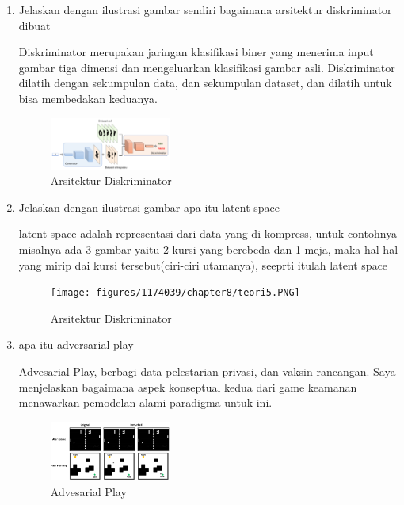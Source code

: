 \begin{enumerate}
            \item Jelaskan dengan ilustrasi gambar sendiri bagaimana arsitektur diskriminator dibuat
            \par Diskriminator merupakan jaringan klasifikasi biner yang menerima input gambar tiga dimensi dan mengeluarkan klasifikasi gambar asli. Diskriminator dilatih dengan sekumpulan data, dan sekumpulan dataset, dan dilatih untuk bisa membedakan keduanya.

            \begin{figure}[H]
                \includegraphics[width=4cm]{figures/1174039/chapter8/teori4.PNG}
                \centering
                  \caption{Arsitektur Diskriminator}
            \end{figure}

            \item Jelaskan dengan ilustrasi gambar apa itu latent space
            \par latent space adalah representasi dari data yang di kompress, untuk contohnya misalnya ada 3 gambar yaitu 2 kursi yang berebeda dan 1 meja, maka hal hal yang mirip dai kursi tersebut(ciri-ciri utamanya), seeprti itulah latent space
            \begin{figure}[H]
                \texttt{[image: figures/1174039/chapter8/teori5.PNG]}
                \centering
                  \caption{Arsitektur Diskriminator}
            \end{figure}

            \item apa itu adversarial play
            \par Advesarial Play, berbagi data pelestarian privasi, dan vaksin rancangan. Saya menjelaskan bagaimana aspek konseptual kedua dari game keamanan menawarkan pemodelan alami paradigma untuk ini.
            \begin{figure}[H]
        \includegraphics[width=4cm]{figures/1174039/chapter8/teori6.PNG}
                \centering
             \caption{Advesarial Play}
         \end{figure}
            

\end{enumerate}
